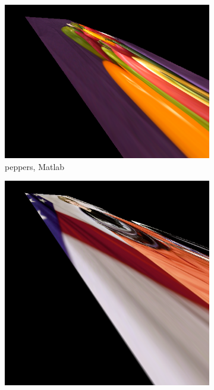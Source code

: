 \documentclass{article}
\begin{document}
\begin{figure}[!ht]
    \centering
    \begin{subfigure}{0.356\textwidth}
        \includegraphics[width=\textwidth]{./fig/projective_peppers.png}
        \caption{peppers, Matlab}
    \end{subfigure}
    \begin{subfigure}{0.267\textwidth}
        \includegraphics[width=\textwidth]{./fig/projective_astronaut.png}

\end{subfigure}
\end{figure}
\end{document}
